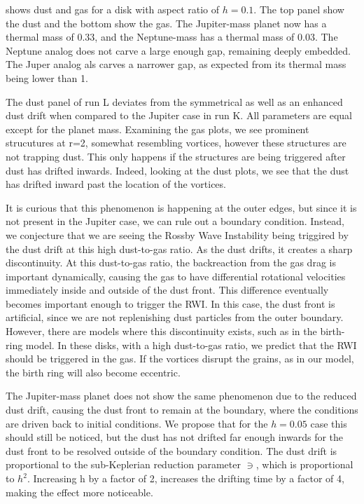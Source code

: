 \documentclass[onecolumn]{report}
\begin{document}
 shows dust and gas for a disk with aspect ratio of $h=0.1$. The top panel show the dust and the bottom show the gas. The Jupiter-mass planet now has a thermal mass of 0.33, and the Neptune-mass has a thermal mass of 0.03. The Neptune analog does not carve a large enough gap, remaining deeply embedded. The Juper analog als carves a narrower gap, as expected from its thermal mass being lower than 1.

The dust panel of run L deviates from the symmetrical as well as an enhanced dust drift when compared to the Jupiter case in run K. All parameters are equal except for the planet mass. Examining the gas plots, we see prominent strucutures at r=2, somewhat resembling vortices, however these structures are not trapping dust. This only happens if the structures are being triggered after dust has drifted inwards. Indeed, looking at the dust plots, we see that the dust has drifted inward past the location of the vortices.

It is curious that this phenomenon is happening at the outer edges, but since it is not present in the Jupiter case, we can rule out a boundary condition. Instead, we conjecture that we are seeing the Rossby Wave Instability being triggired by the dust drift at this high dust-to-gas ratio. As the dust drifts, it creates a sharp discontinuity. At this dust-to-gas ratio, the backreaction from the gas drag is important dynamically, causing the gas to have differential rotational velocities immediately inside and outside of the dust front. This difference eventually becomes important enough to trigger the RWI. In this case, the dust front is artificial, since we are not replenishing dust particles from the outer boundary. However, there are models where this discontinuity exists, such as in the birth-ring model. In these disks, with a high dust-to-gas ratio, we predict that the RWI should be triggered in the gas. If the vortices disrupt the grains, as in our model, the birth ring will also become eccentric.

The Jupiter-mass planet does not show the same phenomenon due to the reduced dust drift, causing the dust front to remain at the boundary, where the conditions are driven back to initial conditions. We propose that for the $h=0.05$ case this should still be noticed, but the dust has not drifted far enough inwards for the dust front to be resolved outside of the boundary condition. The dust drift is proportional to the sub-Keplerian reduction parameter $\ni$, which is proportional to $h^2$. Increasing h by a factor of 2, increases the drifting time by a factor of 4, making the effect more noticeable.
\end{document}
